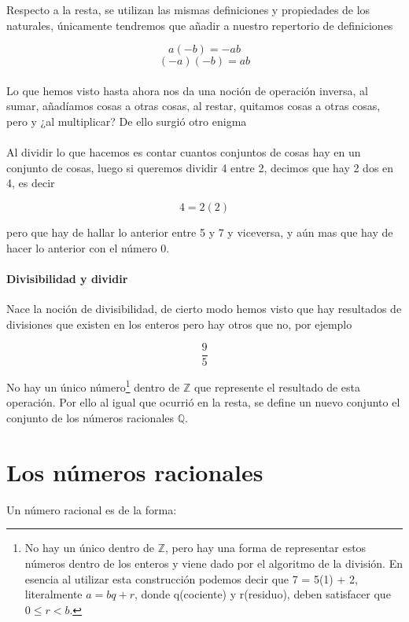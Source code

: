 \documentclass{article}
\begin{document}
Respecto a la resta, se utilizan las mismas definiciones y propiedades de los naturales, únicamente tendremos que añadir a nuestro repertorio de definiciones

$$a(-b) = -ab$$
$$(-a)(-b) = ab$$

\paragraph{} Lo que hemos visto hasta ahora nos da una noción de operación inversa, al sumar, añadíamos cosas a otras cosas, al restar, quitamos cosas a otras cosas, pero y ¿al multiplicar? De ello surgió otro enigma

\paragraph{}Al dividir lo que hacemos es contar cuantos conjuntos de cosas hay en un conjunto de cosas, luego si queremos dividir 4 entre 2, decimos que hay 2 dos en 4, es decir

$$4 = 2(2)$$

pero que hay de hallar lo anterior entre 5 y 7 y viceversa, y aún mas que hay de hacer lo anterior con el número 0.

\paragraph{Divisibilidad y dividir} Nace la noción de divisibilidad, de cierto modo hemos visto que hay resultados de divisiones que existen en los enteros pero hay otros que no, por ejemplo

$$\frac{9}{5}$$

No hay un único número\footnote{No hay un único dentro de $\mathbb{Z}$, pero hay una forma de representar estos números dentro de los enteros y viene dado por el algoritmo de la división. En esencia al utilizar esta construcción podemos decir que 7 = 5(1) + 2, literalmente $a = bq + r$, donde q(cociente) y r(residuo), deben satisfacer que $0 \leq r<b$.} dentro de $\mathbb{Z}$ que represente el resultado de esta operación. Por ello al igual que ocurrió en la resta, se define un nuevo conjunto el conjunto de los números racionales $\mathbb{Q}$.

\section{Los números racionales}

Un número racional es de la forma:
\end{document}
